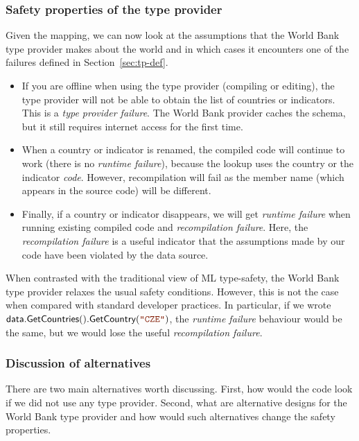 \documentclass[submission,copyright,creativecommons]{eptcs}
\newcommand{\str}[1]{\textnormal{\textcolor{strclr}{\ttfamily "#1"}}}
\newcommand{\ident}[1]{\textnormal{\sffamily #1}}
\begin{document}
\subsubsection{Safety properties of the type provider}

Given the mapping, we can now look at the assumptions that the World Bank type provider makes about
the world and in which cases it encounters one of the failures defined in Section~\ref{sec:tp-def}.

\begin{itemize}
\item If you are offline when using the type provider (compiling or editing), the type provider will
  not be able to obtain the list of countries or indicators. This is a \emph{type provider failure}.
  The World Bank provider caches the schema, but it still requires internet access for the first time.

\item When a country or indicator is renamed, the compiled code will continue to work (there is no
  \emph{runtime failure}), because the lookup uses the country or the indicator \emph{code}. However,
  recompilation will fail as the member name (which appears in the source code) will be different.

\item Finally, if a country or indicator disappears, we will get \emph{runtime failure} when running
  existing compiled code and \emph{recompilation failure}. Here, the \emph{recompilation
  failure} is a useful indicator that the assumptions made by our code have been violated by
  the data source.
\end{itemize}

\noindent
When contrasted with the traditional view of ML type-safety, the World Bank type provider relaxes
the usual safety conditions. However, this is not the case when compared with standard developer
practices. In particular, if we wrote $\ident{data.GetCountries}().\ident{GetCountry}(\str{CZE})$,
the \emph{runtime failure} behaviour would be the same, but we would lose the useful
\emph{recompilation failure}.

\subsubsection{Discussion of alternatives}

There are two main alternatives worth discussing. First, how would the code look if
we did not use any type provider. Second, what are alternative designs for the World Bank type
provider and how would such alternatives change the safety properties.
\end{document}
